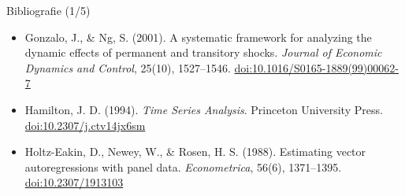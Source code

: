 \begin{frame}{Bibliografie (1/5)}
\begin{itemize}
    \item Gonzalo, J., \& Ng, S. (2001). A systematic framework for analyzing the dynamic effects of permanent and transitory shocks. \textit{Journal of Economic Dynamics and Control}, 25(10), 1527--1546. \href{https://doi.org/10.1016/S0165-1889(99)00062-7}{doi:10.1016/S0165-1889(99)00062-7}
    \item Hamilton, J. D. (1994). \textit{Time Series Analysis}. Princeton University Press. \href{https://doi.org/10.2307/j.ctv14jx6sm}{doi:10.2307/j.ctv14jx6sm}
    \item Holtz-Eakin, D., Newey, W., \& Rosen, H. S. (1988). Estimating vector autoregressions with panel data. \textit{Econometrica}, 56(6), 1371--1395. \href{https://doi.org/10.2307/1913103}{doi:10.2307/1913103}
\end{itemize}
\end{frame}

